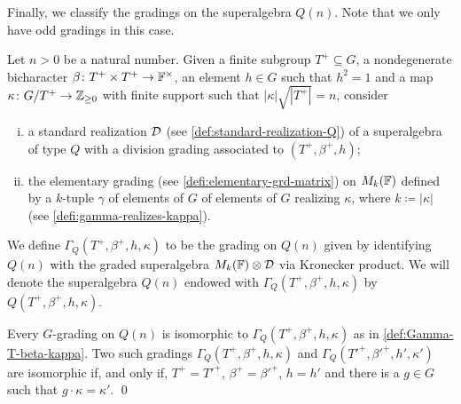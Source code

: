 Finally, we classify the gradings on the superalgebra $Q(n)$. 
Note that we only have odd gradings in this case. 


\begin{defi}\label{def:Gamma-T-beta-kappa-Q}
    Let $n > 0$ be a natural number. 
    Given a finite subgroup $T^+ \subseteq G$, a nondegenerate bicharacter $\beta\colon T^+ \times T^+ \to \mathbb{F}^\times$, an element $h\in G$ such that $h^2 = 1$ and a map $\kappa\colon G/T^+ \to \mathbb{Z}_{\geq 0}$ with finite support such that $|\kappa| \sqrt{|T^+|} = n$, consider 
    \begin{enumerate}[(i)]
        \item a standard realization $\mathcal{D}$ (see \cref{def:standard-realization-Q}) of a superalgebra of type $Q$ with a division grading associated to $(T^+, \beta^+, h)$;
        \item the elementary grading (see \cref{defi:elementary-grd-matrix}) on $M_{k}(\mathbb{F})$ defined by a $k$-tuple $\gamma$ of elements of $G$  of elements of $G$ realizing $\kappa$, where $k \coloneqq |\kappa|$ (see \cref{defi:gamma-realizes-kappa}).  
    \end{enumerate}
    We define $\Gamma_Q (T^+, \beta^+, h, \kappa)$ to be the grading on $Q(n)$ given by identifying $Q(n)$ with the graded superalgebra $M_k(\mathbb{F}) \otimes \mathcal{D}$ via Kronecker product. 
    We will denote the superalgebra $Q(n)$ endowed with $\Gamma_Q (T^+, \beta^+, h, \kappa)$ by $Q (T^+, \beta^+, h, \kappa)$. 
\end{defi}

\begin{cor}\label{cor:iso-Q}
    Every $G$-grading on $Q(n)$ is isomorphic to $\Gamma_Q (T^+, \beta^+, h, \kappa)$ as in \cref{def:Gamma-T-beta-kappa}. 
    Two such gradings $\Gamma_Q (T^+, \beta^+, h, \kappa)$ and $\Gamma_Q (T'^+, \beta'^+, h', \kappa')$ are isomorphic if, and only if, $T^+ = T'^+$, $\beta^+ = \beta'^+$, $h = h'$ and there is a $g\in G$ such that $g\cdot \kappa = \kappa'$. \qed
\end{cor}